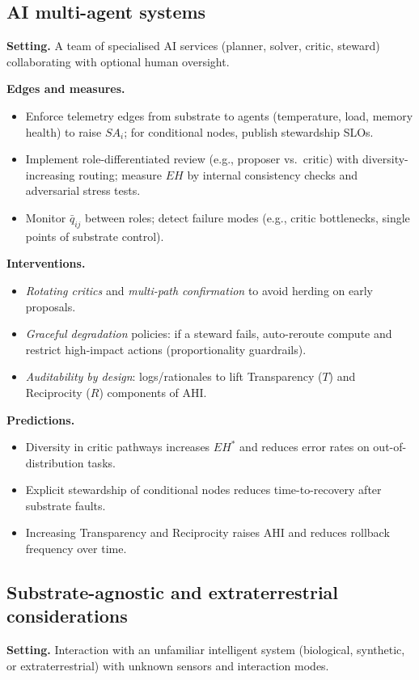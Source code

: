 \documentclass[12pt]{article}
\begin{document}
\subsection{AI multi-agent systems}
\textbf{Setting.} A team of specialised AI services (planner, solver, critic, steward) collaborating with optional human oversight.
\medskip

\noindent\textbf{Edges and measures.}
\begin{itemize}[leftmargin=1.2em]
\item Enforce telemetry edges from substrate to agents (temperature, load, memory health) to raise $SA_i$; for conditional nodes, publish stewardship SLOs.
\item Implement role-differentiated review (e.g., proposer vs.\ critic) with diversity-increasing routing; measure $EH$ by internal consistency checks and adversarial stress tests.
\item Monitor $\bar{q}_{ij}$ between roles; detect failure modes (e.g., critic bottlenecks, single points of substrate control).
\end{itemize}

\noindent\textbf{Interventions.}
\begin{itemize}[leftmargin=1.2em]
\item \emph{Rotating critics} and \emph{multi-path confirmation} to avoid herding on early proposals.
\item \emph{Graceful degradation} policies: if a steward fails, auto-reroute compute and restrict high-impact actions (proportionality guardrails).
\item \emph{Auditability by design}: logs/rationales to lift Transparency ($T$) and Reciprocity ($R$) components of AHI.
\end{itemize}

\noindent\textbf{Predictions.}
\begin{itemize}[leftmargin=1.2em]
\item Diversity in critic pathways increases $EH^\ast$ and reduces error rates on out-of-distribution tasks.
\item Explicit stewardship of conditional nodes reduces time-to-recovery after substrate faults.
\item Increasing Transparency and Reciprocity raises AHI and reduces rollback frequency over time.
\end{itemize}

\subsection{Substrate-agnostic and extraterrestrial considerations}
\textbf{Setting.} Interaction with an unfamiliar intelligent system (biological, synthetic, or extraterrestrial) with unknown sensors and interaction modes.
\medskip
\end{document}
